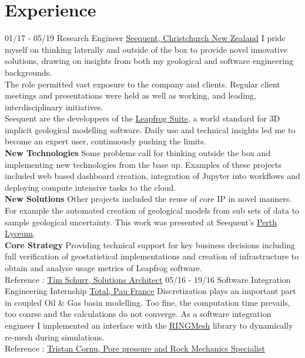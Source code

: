 \documentclass[]{friggeri-cv}
\begin{document}
\section{Experience}
\begin{entrylist}
  \entry
    {01/17 - 05/19}
    {Research Engineer}
    {\href{https://www.seequent.com/}{Seequent, Christchurch New Zealand}}
    {I pride myself on thinking laterally and outside of the box to provide novel innovative solutions, drawing on insights from both my geological and software engineering backgrounds.
    \\[3pt]
    The role permitted vast exposure to the company and clients. Regular client meetings and presentations were held as well as working, and leading, interdisciplinary initiatives.
    \\[3pt]
    Seequent are the developpers of the \href{https://www.leapfrog3d.com/}{Leapfrog Suite}, a world standard for 3D implicit geological modelling software. Daily use and technical insights led me to become an expert user, continuously pushing the limits.
    \\[6pt]
   	\textbf{New Technologies} Some problems call for thinking outside the box and implementing new technologies from the base up. Examples of these projects included web based dashboard creation, integration of Jupyter into workflows and deploying compute intensive tasks to the cloud.
   	\\[6pt]
   	\textbf{New Solutions} Other projects included the reuse of core IP in novel manners. For example the automated creation of geological models from sub sets of data to sample geological uncertainty. This work was presented at Seequent's \href{https://www.youtube.com/watch?v=jt26J5ljlA0}{Perth Lyceum}.
    \\[6pt]
   	\textbf{Core Strategy} Providing technical support for key business decisions including full verification of geostatistical implementations and creation of infrastructure to obtain and analyse usage metrics of Leapfrog software. 
    \\
    Reference : \href{mailto:tim.schurr@seequent.com}{Tim Schurr, Solutions Architect}
	}
  \entry
    {05/16 - 19/16}
    {Software Integration Engineering Internship}
    {\href{https://www.total.com/en}{Total, Pau France}}
    {Discretization plays an important part in coupled Oil \& Gas basin modelling. Too fine, the computation time prevails, too coarse and the calculations do not converge. As a software integration engineer I implemented an interface with the \href{http://www.ring-team.org/software/ringmesh}{RINGMesh} library to dynamically re-mesh during simulations.\\ Reference : \href{mailto:tristan.cornu@total.com}{Tristan Cornu, Pore pressure and Rock Mechanics Specialist}}
    \end{entrylist}
    
\end{document}

